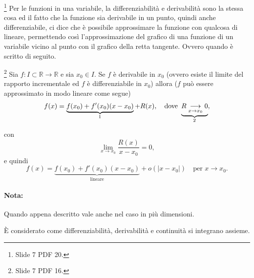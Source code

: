 \footnote{Slide 7 PDF 20.}
Per le funzioni in una variabile, la differenziabilità e derivabilità sono la stessa cosa ed il fatto che la funzione sia derivabile in un punto, quindi anche differenziabile, ci dice che è possibile approssimare la funzione con qualcosa di lineare, permettendo così l'approssimazione del grafico di una funzione di un variabile vicino al punto con il grafico della retta tangente. Ovvero quando è scritto di seguito.
\begin{property}\footnote{Slide 7 PDF 16.}
	Sia $f: I\subset \mathbb{R}\rightarrow\mathbb{R}$ e sia $x_0\in I$. Se $f$ è derivabile in $x_0$ (ovvero esiste il limite del rapporto incrementale ed $f$ è differenziabile in $x_0$) allora ($f$ può essere approssimato in modo lineare come segue)
	\begin{equation*}
		f(x) = \underbrace{f(x_0) + f'(x_0)(x-x_0)}_{\footnotemark} + R(x), \quad\text{dove } \underbrace{R\underset{x\rightarrow x_0}{\longrightarrow} 0}_{\footnotemark},
	\end{equation*}
	con
	\begin{equation*}
		\lim\limits_{x\rightarrow x_0} \frac{R(x)}{x-x_0} = 0,
	\end{equation*}
	e quindi
	\begin{equation*}
		f(x) = \underbrace{f(x_0)+f'(x_0)(x-x_0)}_{\text{lineare}} + o(|x-x_0|)\quad\text{per }x\rightarrow x_0.
	\end{equation*}
	\addtocounter{footnote}{-1}
	
\end{property}

\paragraph{Nota:} Quando appena descritto vale anche nel caso in più dimensioni.

\label{sssec:differenziabilita_continuita}
È considerato come differenziabilità, derivabilità e continuità si integrano assieme.

